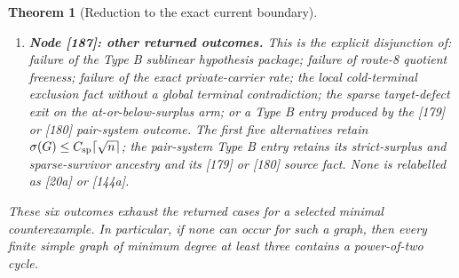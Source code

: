 \documentclass[11pt]{article}
\newtheorem{theorem}{Theorem}[section]
\begin{document}
\begin{theorem}[Reduction to the exact current boundary]
\begin{enumerate}[label=(\roman*), leftmargin=2.2em]
[184], and [185], together with the joint balances and silent-terminal
exclusion of \cref{lem:typeA-unified-joint-balance}.  Exclusion of the
remaining visible-entry history is open.
\item \textbf{Node [187]: other returned outcomes.}
This is the explicit disjunction of: failure of the Type B sublinear
hypothesis package; failure of route-8 quotient freeness; failure of the
exact private-carrier rate; the local cold-terminal exclusion fact without a
global terminal contradiction; the sparse target-defect exit on the
at-or-below-surplus arm; or a Type B entry produced by the [179] or [180]
pair-system outcome.  The first five alternatives retain
\(\sigma(G)\le C_{\rm sp}\lceil\sqrt n\rceil\); the pair-system Type B entry
retains its strict-surplus and sparse-survivor ancestry and its [179] or
[180] source fact.  None is relabelled as [20a] or [144a].
\end{enumerate}
These six outcomes exhaust the returned cases for a selected minimal
counterexample.  In particular, if none can occur for such a graph, then
every finite simple graph of minimum degree at least three contains a
power-of-two cycle.
\end{theorem}
\end{document}
